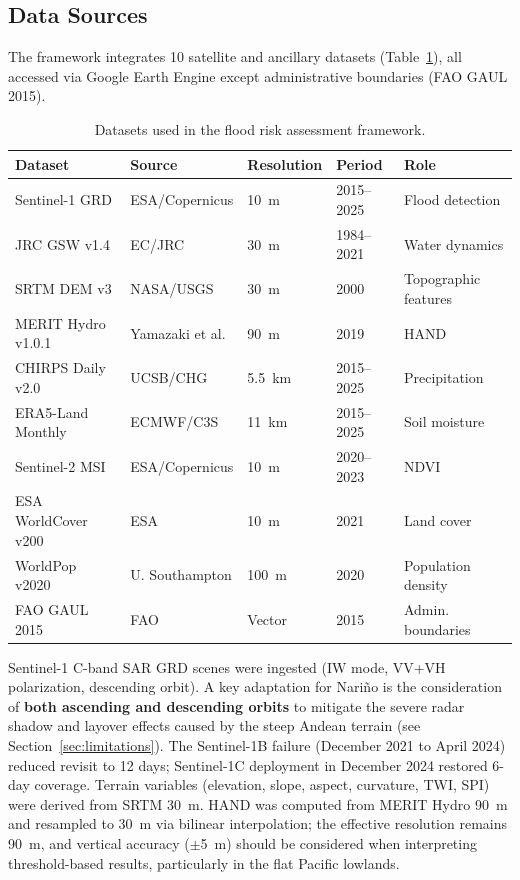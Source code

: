 \documentclass{article}
\begin{document}
\subsection{Data Sources}

The framework integrates 10 satellite and ancillary datasets (Table~\ref{tab:data_sources}), all accessed via Google Earth Engine \citep{Gorelick2017} except administrative boundaries (FAO GAUL 2015).

\begin{table}[htbp]
\caption{Datasets used in the flood risk assessment framework.}
\label{tab:data_sources}
\centering
\footnotesize
\begin{tabular}{lllll}
\toprule
\textbf{Dataset} & \textbf{Source} & \textbf{Resolution} & \textbf{Period} & \textbf{Role} \\
\midrule
Sentinel-1 GRD & ESA/Copernicus & \SI{10}{\metre} & 2015--2025 & Flood detection \\
JRC GSW v1.4 & EC/JRC & \SI{30}{\metre} & 1984--2021 & Water dynamics \\
SRTM DEM v3 & NASA/USGS & \SI{30}{\metre} & 2000 & Topographic features \\
MERIT Hydro v1.0.1 & Yamazaki et al. & \SI{90}{\metre} & 2019 & HAND \\
CHIRPS Daily v2.0 & UCSB/CHG & \SI{5.5}{\kilo\metre} & 2015--2025 & Precipitation \\
ERA5-Land Monthly & ECMWF/C3S & \SI{11}{\kilo\metre} & 2015--2025 & Soil moisture \\
Sentinel-2 MSI & ESA/Copernicus & \SI{10}{\metre} & 2020--2023 & NDVI \\
ESA WorldCover v200 & ESA & \SI{10}{\metre} & 2021 & Land cover \\
WorldPop v2020 & U. Southampton & \SI{100}{\metre} & 2020 & Population density \\
FAO GAUL 2015 & FAO & Vector & 2015 & Admin. boundaries \\
\bottomrule
\end{tabular}
\end{table}

Sentinel-1 C-band SAR GRD scenes were ingested (IW mode, VV+VH polarization, descending orbit). A key adaptation for Nari\~no is the consideration of \textbf{both ascending and descending orbits} to mitigate the severe radar shadow and layover effects caused by the steep Andean terrain (see Section~\ref{sec:limitations}). The Sentinel-1B failure (December 2021 to April 2024) reduced revisit to 12 days; Sentinel-1C deployment in December 2024 restored 6-day coverage. Terrain variables (elevation, slope, aspect, curvature, TWI, SPI) were derived from SRTM \SI{30}{\metre}. HAND was computed from MERIT Hydro \SI{90}{\metre} \citep{Yamazaki2019, Renno2008, Nobre2011} and resampled to \SI{30}{\metre} via bilinear interpolation; the effective resolution remains \SI{90}{\metre}, and vertical accuracy ($\pm$\SI{5}{\metre}) should be considered when interpreting threshold-based results, particularly in the flat Pacific lowlands.
\end{document}
